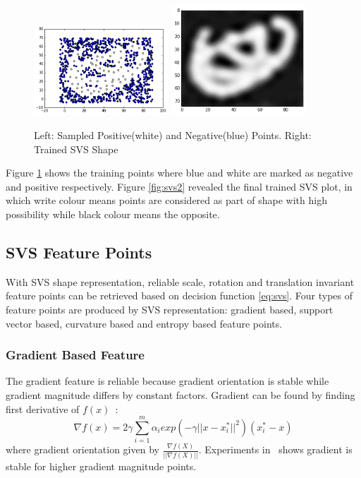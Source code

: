 \begin{figure}
    \centering
    \includegraphics[width=0.45\textwidth]{resources/Background/svs_samples}
    \hfill
    \includegraphics[width=0.45\textwidth]{resources/Background/trained_svs} 
    \label{fig:svs2}
    \label{fig:svs1}
    \caption{Left: Sampled Positive(white) and Negative(blue) Points. Right: Trained SVS Shape}
\end{figure}

Figure \ref{fig:svs1} shows the training points where blue and white are marked as negative and positive respectively. Figure \ref{fig:svs2} revealed the final trained SVS plot, in which write colour means points are considered as part of shape with high possibility while black colour means the opposite.

\subsection{SVS Feature Points}
With SVS shape representation, reliable scale, rotation and translation invariant feature points can be retrieved based on decision function \ref{eq:svs}. Four types of feature points are produced by SVS representation: gradient based, support vector based, curvature based and entropy based feature points.

\subsubsection{Gradient Based Feature}
The gradient feature is reliable because gradient orientation is stable while gradient magnitude differs by constant factors. Gradient can be found by finding first derivative of $f(x)$~\cite{Nguyen2013}:
\begin{equation}
\label{eq:svsgrad}
\nabla f(x)=2\gamma\sum^m_{i=1}\alpha_iexp(-\gamma||x-x^*_i||^2)(x^*_i-x)
\end{equation}
where gradient orientation given by $\frac{\nabla f(X)}{||\nabla f(X)||}$. Experiments in~\cite{Nguyen2013} shows gradient is stable for higher gradient magnitude points.

